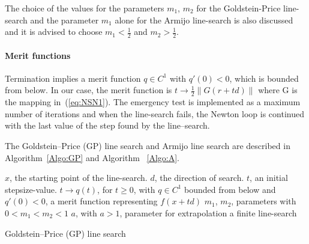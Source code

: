 The choice of the values for the parameters $m_1$, $m_2$ for the
Goldstein-Price line-search and the parameter $m_1$ alone for the Armijo
line-search is also discussed and it is advised to choose $m_1 < \frac{1}{2}$
and $m_2 > \frac{1}{2}$.
\paragraph{Merit functions}

Termination implies a merit function $q \in C^1$ with $q'(0) < 0$, which is
bounded from below. In our case, the merit function is
$t \to \frac{1}{2} \|G(r + t d)\|$ where G is the mapping in~(\ref{eq:NSN1}). The
emergency test is implemented as a maximum number of iterations and when the
line-search fails, the Newton loop is continued with the last value of the step found by the line--search.

The Goldstein--Price (GP) line search and Armijo line search are described in Algorithm~\ref{Algo:GP} and Algorithm ~\ref{Algo:A}.



\begin{algorithm}
  \begin{algorithmic}
    {\sf
      \REQUIRE $x$, the starting point of the line-search.
      \REQUIRE $d$, the direction of search.
      \REQUIRE $t$, an initial stepsize-value.
      \REQUIRE $t \to q(t)$, for $t \geq 0$, with $q \in C^1$ bounded from below and $q'(0) < 0$, a merit function representing $f(x + t d)$
      \REQUIRE $m_1$, $m_2$, parameters with $0 < m_1 < m_2 < 1$
      \REQUIRE $a$, with $a > 1$, parameter for extrapolation
      \ENSURE a finite line-search

      \ENDIF
      \ENDIF

      \ELSE
      \ENDIF
      \ENDWHILE
    }
  \end{algorithmic}
  \caption{Goldstein--Price (GP) line search}  \label{Algo:GP}
\end{algorithm}

